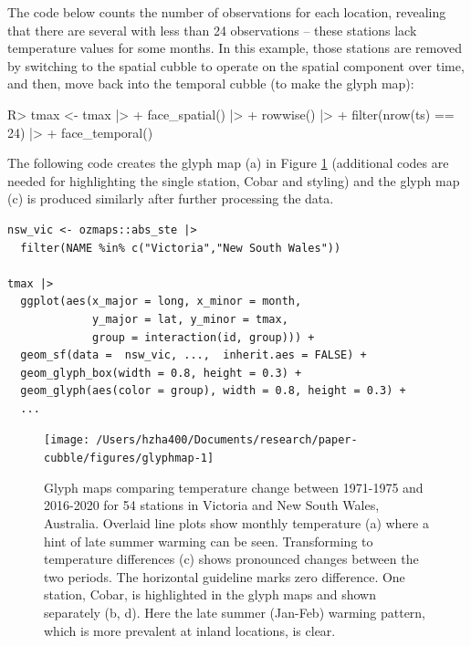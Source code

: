 \documentclass[
  shortnames]{jss}
\begin{document}
The code below counts the number of observations for each location, revealing that there are several with less than 24 observations -- these stations lack temperature values for some months. In this example, those stations are removed by switching to the spatial cubble to operate on the spatial component over time, and then, move back into the temporal cubble (to make the glyph map):

\begin{CodeChunk}
\begin{CodeInput}
R> tmax <- tmax |> 
+   face_spatial() |> 
+   rowwise() |>
+   filter(nrow(ts) == 24) |>
+   face_temporal()
\end{CodeInput}
\end{CodeChunk}

The following code creates the glyph map (a) in Figure \ref{fig:glyphmap} (additional codes are needed for highlighting the single station, Cobar and styling) and the glyph map (c) is produced similarly after further processing the data.

\begin{verbatim}
nsw_vic <- ozmaps::abs_ste |> 
  filter(NAME %in% c("Victoria","New South Wales"))

tmax |> 
  ggplot(aes(x_major = long, x_minor = month, 
             y_major = lat, y_minor = tmax,
             group = interaction(id, group))) + 
  geom_sf(data =  nsw_vic, ...,  inherit.aes = FALSE) + 
  geom_glyph_box(width = 0.8, height = 0.3) + 
  geom_glyph(aes(color = group), width = 0.8, height = 0.3) +
  ...
\end{verbatim}

\begin{CodeChunk}
\begin{figure}

{\centering \texttt{[image: /Users/hzha400/Documents/research/paper-cubble/figures/glyphmap-1]} 

}

\caption[Glyph maps comparing temperature change between 1971-1975 and 2016-2020 for 54 stations in Victoria and New South Wales, Australia]{Glyph maps comparing temperature change between 1971-1975 and 2016-2020 for 54 stations in Victoria and New South Wales, Australia. Overlaid line plots show monthly temperature (a) where a hint of late summer warming can be seen. Transforming to temperature differences (c) shows pronounced changes between the two periods. The horizontal guideline marks zero difference. One station, Cobar, is highlighted in the glyph maps and shown separately (b, d). Here the late summer (Jan-Feb) warming pattern, which is more prevalent at inland locations, is clear.}\label{fig:glyphmap}
\end{figure}
\end{CodeChunk}
\end{document}
